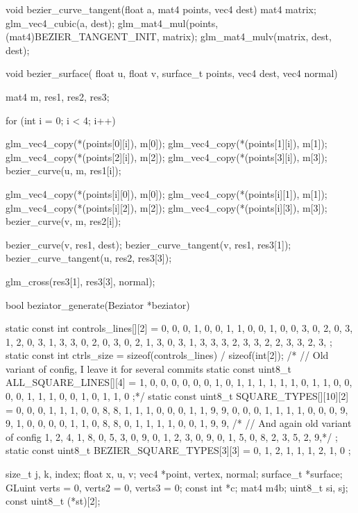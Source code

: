 \documentclass[14pt,a4paper]{extarticle}
\theoremstyle{definition}
\renewcommand{\[}{\begin{singlespace}\begin{equation*}}
\renewcommand{\]}{\end{equation*}\end{singlespace}}
\begin{document}
\begin{multicols}{2}
\begin{ccode}
void bezier_curve_tangent(float a, mat4 points, vec4 dest) {
    mat4 matrix;
    glm_vec4_cubic(a, dest);
    glm_mat4_mul(points, (mat4)BEZIER_TANGENT_INIT, matrix);
    glm_mat4_mulv(matrix, dest, dest);
}

void bezier_surface(
        float u, float v, surface_t points, vec4 dest, vec4 normal) {
    mat4 m, res1, res2, res3;

    for (int i = 0; i < 4; i++) {
        glm_vec4_copy(*(points[0][i]), m[0]);
        glm_vec4_copy(*(points[1][i]), m[1]);
        glm_vec4_copy(*(points[2][i]), m[2]);
        glm_vec4_copy(*(points[3][i]), m[3]);
        bezier_curve(u, m, res1[i]);

        glm_vec4_copy(*(points[i][0]), m[0]);
        glm_vec4_copy(*(points[i][1]), m[1]);
        glm_vec4_copy(*(points[i][2]), m[2]);
        glm_vec4_copy(*(points[i][3]), m[3]);
        bezier_curve(v, m, res2[i]);
    }

    bezier_curve(v, res1, dest);
    bezier_curve_tangent(v, res1, res3[1]);
    bezier_curve_tangent(u, res2, res3[3]);

    glm_cross(res3[1], res3[3], normal);
}

bool beziator_generate(Beziator *beziator) {
    static const int controls_lines[][2] = {
        {0, 0}, {0, 1}, {0, 0}, {1, 1}, {0, 0}, {1, 0},
        {0, 3}, {0, 2}, {0, 3}, {1, 2}, {0, 3}, {1, 3},
        {3, 0}, {2, 0}, {3, 0}, {2, 1}, {3, 0}, {3, 1},
        {3, 3}, {3, 2}, {3, 3}, {2, 2}, {3, 3}, {2, 3},
    };
    static const int ctrls_size = sizeof(controls_lines) / sizeof(int[2]);
    /* // Old variant of config, I leave it for several commits
    static const uint8_t ALL_SQUARE_LINES[][4] = {
        {1, 0, 0, 0}, {0, 0, 0, 1}, {0, 1, 1, 1}, {1, 1, 1, 0},
        {1, 1, 0, 0}, {0, 0, 1, 1}, {1, 0, 0, 1}, {0, 1, 1, 0}
    };*/
    static const uint8_t SQUARE_TYPES[][10][2] = {
        {{0, 0}, {0, 1}, {1, 1}, {0, 0}, {8, 8},
         {1, 1}, {1, 0}, {0, 0}, {1, 1}, {9, 9}},
        {{0, 0}, {0, 1}, {1, 1}, {1, 0}, {0, 0}, {9, 9}},
        {{1, 0}, {0, 0}, {0, 1}, {1, 0}, {8, 8},
         {0, 1}, {1, 1}, {1, 0}, {0, 1}, {9, 9}},
        /* // And again old variant of config
        {1, 2, 4, 1, 8, 0, 5, 3, 0, 9},
        {0, 1, 2, 3, 0, 9},
        {0, 1, 5, 0, 8, 2, 3, 5, 2, 9},*/
    };
    static const uint8_t BEZIER_SQUARE_TYPES[3][3] = {
        {0, 1, 2}, {1, 1, 1}, {2, 1, 0}
    };

    size_t j, k, index;
    float x, u, v;
    vec4 *point, vertex, normal;
    surface_t *surface;
    GLuint verts = 0, verts2 = 0, verts3 = 0;
    const int *c;
    mat4 m4b;
    uint8_t si, sj;
    const uint8_t (*st)[2];

}
\end{ccode}
\end{multicols}
\end{document}
